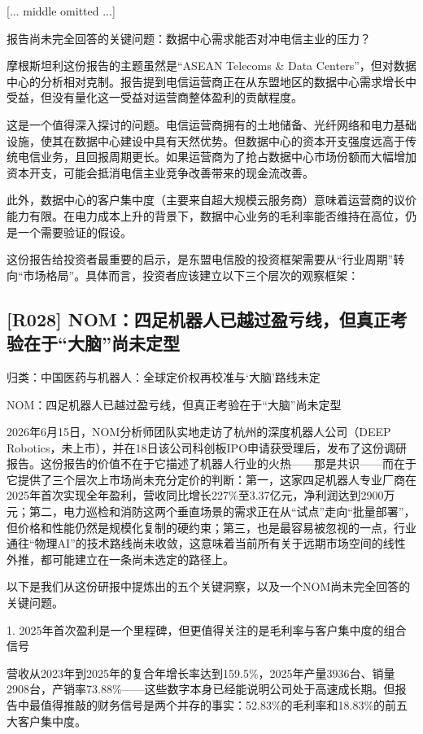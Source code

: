 \documentclass[11pt]{ctexart}
\begin{document}
[... middle omitted ...]

 报告尚未完全回答的关键问题：数据中心需求能否对冲电信主业的压力？

摩根斯坦利这份报告的主题虽然是“ASEAN Telecoms \& Data Centers”，但对数据中心的分析相对克制。报告提到电信运营商正在从东盟地区的数据中心需求增长中受益，但没有量化这一受益对运营商整体盈利的贡献程度。

这是一个值得深入探讨的问题。电信运营商拥有的土地储备、光纤网络和电力基础设施，使其在数据中心建设中具有天然优势。但数据中心的资本开支强度远高于传统电信业务，且回报周期更长。如果运营商为了抢占数据中心市场份额而大幅增加资本开支，可能会抵消电信主业竞争改善带来的现金流改善。

此外，数据中心的客户集中度（主要来自超大规模云服务商）意味着运营商的议价能力有限。在电力成本上升的背景下，数据中心业务的毛利率能否维持在高位，仍是一个需要验证的假设。

这份报告给投资者最重要的启示，是东盟电信股的投资框架需要从“行业周期”转向“市场格局”。具体而言，投资者应该建立以下三个层次的观察框架：

\subsection{[R028] NOM：四足机器人已越过盈亏线，但真正考验在于“大脑”尚未定型}
{\small\color{refgray}归类：中国医药与机器人：全球定价权再校准与‘大脑’路线未定}

NOM：四足机器人已越过盈亏线，但真正考验在于“大脑”尚未定型

2026年6月15日，NOM分析师团队实地走访了杭州的深度机器人公司（DEEP Robotics，未上市），并在18日该公司科创板IPO申请获受理后，发布了这份调研报告。这份报告的价值不在于它描述了机器人行业的火热——那是共识——而在于它提供了三个层次上市场尚未充分定价的判断：第一，这家四足机器人专业厂商在2025年首次实现全年盈利，营收同比增长227\%至3.37亿元，净利润达到2900万元；第二，电力巡检和消防这两个垂直场景的需求正在从“试点”走向“批量部署”，但价格和性能仍然是规模化复制的硬约束；第三，也是最容易被忽视的一点，行业通往“物理AI”的技术路线尚未收敛，这意味着当前所有关于远期市场空间的线性外推，都可能建立在一条尚未选定的路径上。

以下是我们从这份研报中提炼出的五个关键洞察，以及一个NOM尚未完全回答的关键问题。

1. 2025年首次盈利是一个里程碑，但更值得关注的是毛利率与客户集中度的组合信号

营收从2023年到2025年的复合年增长率达到159.5\%，2025年产量3936台、销量2908台，产销率73.88\%——这些数字本身已经能说明公司处于高速成长期。但报告中最值得推敲的财务信号是两个并存的事实：52.83\%的毛利率和18.83\%的前五大客户集中度。
\end{document}

